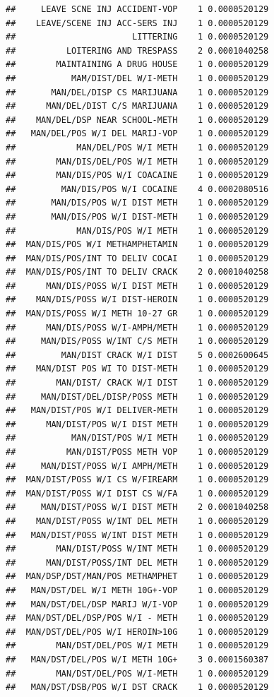 \documentclass[]{book}
\begin{document}
\begin{verbatim}
##     LEAVE SCNE INJ ACCIDENT-VOP    1 0.0000520129
##    LEAVE/SCENE INJ ACC-SERS INJ    1 0.0000520129
##                       LITTERING    1 0.0000520129
##          LOITERING AND TRESPASS    2 0.0001040258
##        MAINTAINING A DRUG HOUSE    1 0.0000520129
##           MAM/DIST/DEL W/I-METH    1 0.0000520129
##       MAN/DEL/DISP CS MARIJUANA    1 0.0000520129
##      MAN/DEL/DIST C/S MARIJUANA    1 0.0000520129
##    MAN/DEL/DSP NEAR SCHOOL-METH    1 0.0000520129
##   MAN/DEL/POS W/I DEL MARIJ-VOP    1 0.0000520129
##            MAN/DEL/POS W/I METH    1 0.0000520129
##        MAN/DIS/DEL/POS W/I METH    1 0.0000520129
##        MAN/DIS/POS W/I COACAINE    1 0.0000520129
##         MAN/DIS/POS W/I COCAINE    4 0.0002080516
##       MAN/DIS/POS W/I DIST METH    1 0.0000520129
##       MAN/DIS/POS W/I DIST-METH    1 0.0000520129
##            MAN/DIS/POS W/I METH    1 0.0000520129
##  MAN/DIS/POS W/I METHAMPHETAMIN    1 0.0000520129
##  MAN/DIS/POS/INT TO DELIV COCAI    1 0.0000520129
##  MAN/DIS/POS/INT TO DELIV CRACK    2 0.0001040258
##      MAN/DIS/POSS W/I DIST METH    1 0.0000520129
##    MAN/DIS/POSS W/I DIST-HEROIN    1 0.0000520129
##  MAN/DIS/POSS W/I METH 10-27 GR    1 0.0000520129
##      MAN/DIS/POSS W/I-AMPH/METH    1 0.0000520129
##     MAN/DIS/POSS W/INT C/S METH    1 0.0000520129
##         MAN/DIST CRACK W/I DIST    5 0.0002600645
##    MAN/DIST POS WI TO DIST-METH    1 0.0000520129
##        MAN/DIST/ CRACK W/I DIST    1 0.0000520129
##     MAN/DIST/DEL/DISP/POSS METH    1 0.0000520129
##   MAN/DIST/POS W/I DELIVER-METH    1 0.0000520129
##      MAN/DIST/POS W/I DIST METH    1 0.0000520129
##           MAN/DIST/POS W/I METH    1 0.0000520129
##          MAN/DIST/POSS METH VOP    1 0.0000520129
##     MAN/DIST/POSS W/I AMPH/METH    1 0.0000520129
##  MAN/DIST/POSS W/I CS W/FIREARM    1 0.0000520129
##  MAN/DIST/POSS W/I DIST CS W/FA    1 0.0000520129
##     MAN/DIST/POSS W/I DIST METH    2 0.0001040258
##    MAN/DIST/POSS W/INT DEL METH    1 0.0000520129
##   MAN/DIST/POSS W/INT DIST METH    1 0.0000520129
##        MAN/DIST/POSS W/INT METH    1 0.0000520129
##      MAN/DIST/POSS/INT DEL METH    1 0.0000520129
##  MAN/DSP/DST/MAN/POS METHAMPHET    1 0.0000520129
##   MAN/DST/DEL W/I METH 10G+-VOP    1 0.0000520129
##   MAN/DST/DEL/DSP MARIJ W/I-VOP    1 0.0000520129
##  MAN/DST/DEL/DSP/POS W/I - METH    1 0.0000520129
##  MAN/DST/DEL/POS W/I HEROIN>10G    1 0.0000520129
##        MAN/DST/DEL/POS W/I METH    1 0.0000520129
##   MAN/DST/DEL/POS W/I METH 10G+    3 0.0001560387
##        MAN/DST/DEL/POS W/I-METH    1 0.0000520129
##   MAN/DST/DSB/POS W/I DST CRACK    1 0.0000520129

\end{verbatim}
\end{document}

